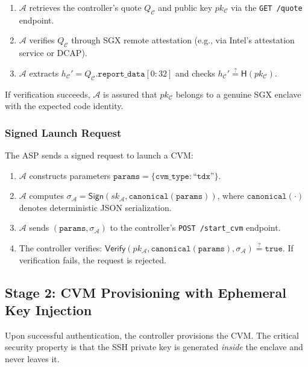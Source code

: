 \begin{enumerate}
    \item $\mathcal{A}$ retrieves the controller's quote $Q_\mathcal{C}$ and public key $pk_\mathcal{C}$ via the \texttt{GET /quote} endpoint.
    \item $\mathcal{A}$ verifies $Q_\mathcal{C}$ through SGX remote attestation (e.g., via Intel's attestation service or DCAP).
    \item $\mathcal{A}$ extracts $h_\mathcal{C}' = Q_\mathcal{C}.\texttt{report\_data}[0{:}32]$ and checks $h_\mathcal{C}' \stackrel{?}{=} \textsf{H}(pk_\mathcal{C})$.
\end{enumerate}

\noindent If verification succeeds, $\mathcal{A}$ is assured that $pk_\mathcal{C}$ belongs to a genuine SGX enclave with the expected code identity.

\subsubsection{Signed Launch Request}
The ASP sends a signed request to launch a CVM:

\begin{enumerate}
    \item $\mathcal{A}$ constructs parameters $\texttt{params} = \{\texttt{cvm\_type}: \texttt{``tdx''}\}$.
    \item $\mathcal{A}$ computes $\sigma_\mathcal{A} = \textsf{Sign}(sk_\mathcal{A}, \texttt{canonical}(\texttt{params}))$, where $\texttt{canonical}(\cdot)$ denotes deterministic JSON serialization.
    \item $\mathcal{A}$ sends $(\texttt{params}, \sigma_\mathcal{A})$ to the controller's \texttt{POST /start\_cvm} endpoint.
    \item The controller verifies: $\textsf{Verify}(pk_\mathcal{A}, \texttt{canonical}(\texttt{params}), \sigma_\mathcal{A}) \stackrel{?}{=} \texttt{true}$. If verification fails, the request is rejected.
\end{enumerate}

\subsection{Stage 2: CVM Provisioning with Ephemeral Key Injection}
\label{sec:commissioning:stage2}

Upon successful authentication, the controller provisions the CVM. The critical security property is that the SSH private key is generated \emph{inside} the enclave and never leaves it.

